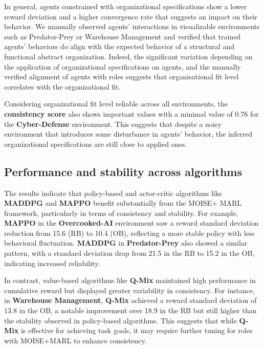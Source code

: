 \documentclass[sigconf,anonymous]{aamas}
\begin{document}
In general, agents constrained with organizational specifications show a lower reward deviation and a higher convergence rate that suggests an impact on their behavior. We manually observed agents' interactions in visualizable environments such as Predator-Prey or Warehouse Management and verified that trained agents' behaviors do align with the expected behavior of a structural and functional abstract organization.
%
Indeed, the significant variation depending on the application of organizational specifications on agents, and the manually verified alignment of agents with roles suggests that organisational fit level correlates with the organizational fit.

Considering organizational fit level reliable across all environments, the \textbf{consistency score} also shows important values with a minimal value of 0.76 for the \textbf{Cyber-Defense} environment. This suggests that despite a noisy environment that introduces some disturbance in agents' behavior, the inferred organizational specifications are still close to applied ones.

\subsection{Performance and stability across algorithms}

The results indicate that policy-based and actor-critic algorithms like \textbf{MADDPG} and \textbf{MAPPO} benefit substantially from the MOISE+ MARL framework, particularly in terms of consistency and stability. For example, \textbf{MAPPO} in the \textbf{Overcooked-AI} environment saw a reward standard deviation reduction from 15.6 (RB) to 10.4 (OB), reflecting a more stable policy with less behavioral fluctuation. \textbf{MADDPG} in \textbf{Predator-Prey} also showed a similar pattern, with a standard deviation drop from 21.5 in the RB to 15.2 in the OB, indicating increased reliability.

In contrast, value-based algorithms like \textbf{Q-Mix} maintained high performance in cumulative reward but displayed greater variability in consistency. For instance, in \textbf{Warehouse Management}, \textbf{Q-Mix} achieved a reward standard deviation of 13.8 in the OB, a notable improvement over 18.9 in the RB but still higher than the stability observed in policy-based algorithms. This suggests that while \textbf{Q-Mix} is effective for achieving task goals, it may require further tuning for roles with MOISE+MARL to enhance consistency.
\end{document}
